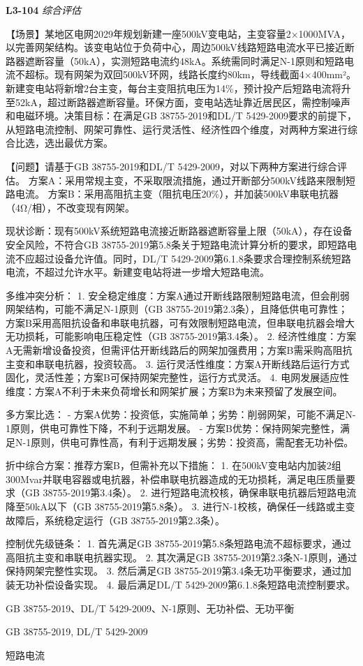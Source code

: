\documentclass[12pt,a4paper]{ctexart}
\begin{document}
\noindent\textbf{L3-104} \hfill \textit{综合评估}
\begin{description}[leftmargin=1.5em,style=nextline,font=\normalfont]
  \item[Q:] 【场景】某地区电网2029年规划新建一座500kV变电站，主变容量2×1000MVA，以完善网架结构。该变电站位于负荷中心，周边500kV线路短路电流水平已接近断路器遮断容量（50kA），实测短路电流约48kA。系统需同时满足N-1原则和短路电流不超标。现有网架为双回500kV环网，线路长度约80km，导线截面4×400mm²。新建变电站将新增2台主变，每台主变阻抗电压为14\%，预计投产后短路电流将升至52kA，超过断路器遮断容量。环保方面，变电站选址靠近居民区，需控制噪声和电磁环境。决策目标：在满足GB 38755-2019和DL/T 5429-2009要求的前提下，从短路电流控制、网架可靠性、运行灵活性、经济性四个维度，对两种方案进行综合比选，选出最优方案。

【问题】请基于GB 38755-2019和DL/T 5429-2009，对以下两种方案进行综合评估。
方案A：采用常规主变，不采取限流措施，通过开断部分500kV线路来限制短路电流。
方案B：采用高阻抗主变（阻抗电压20\%），并加装500kV串联电抗器（4Ω/相），不改变现有网架。
  \item[A:] 现状诊断：现有500kV系统短路电流接近断路器遮断容量上限（50kA），存在设备安全风险，不符合GB 38755-2019第5.8条关于短路电流计算分析的要求，即短路电流不应超过设备允许值。同时，DL/T 5429-2009第6.1.8条要求合理控制系统短路电流，不超过允许水平。新建变电站将进一步增大短路电流。

多维冲突分析：
1. 安全稳定维度：方案A通过开断线路限制短路电流，但会削弱网架结构，可能不满足N-1原则（GB 38755-2019第2.3条），且降低供电可靠性；方案B采用高阻抗设备和串联电抗器，可有效限制短路电流，但串联电抗器会增大无功损耗，可能影响电压稳定性（GB 38755-2019第3.4条）。
2. 经济性维度：方案A无需新增设备投资，但需评估开断线路后的网架加强费用；方案B需采购高阻抗主变和串联电抗器，投资较高。
3. 运行灵活性维度：方案A开断线路后运行方式固化，灵活性差；方案B可保持网架完整性，运行方式灵活。
4. 电网发展适应性维度：方案A不利于未来负荷增长和网架扩展；方案B为未来预留了发展空间。

多方案比选：
- 方案A优势：投资低，实施简单；劣势：削弱网架，可能不满足N-1原则，供电可靠性下降，不利于远期发展。
- 方案B优势：保持网架完整性，满足N-1原则，供电可靠性高，有利于远期发展；劣势：投资高，需配套无功补偿。

折中综合方案：推荐方案B，但需补充以下措施：
1. 在500kV变电站内加装2组300Mvar并联电容器或电抗器，补偿串联电抗器造成的无功损耗，满足电压质量要求（GB 38755-2019第3.4条）。
2. 进行短路电流校核，确保串联电抗器后短路电流降至50kA以下（GB 38755-2019第5.8条）。
3. 进行N-1校核，确保任一线路或主变故障后，系统稳定运行（GB 38755-2019第2.3条）。

控制优先级链条：
1. 首先满足GB 38755-2019第5.8条短路电流不超标要求，通过高阻抗主变和串联电抗器实现。
2. 其次满足GB 38755-2019第2.3条N-1原则，通过保持网架完整性实现。
3. 然后满足GB 38755-2019第3.4条无功平衡要求，通过加装无功补偿设备实现。
4. 最后满足DL/T 5429-2009第6.1.8条短路电流控制要求。
  \item[KW:] GB 38755-2019、DL/T 5429-2009、N-1原则、无功补偿、无功平衡
  \item[Std:] GB 38755-2019, DL/T 5429-2009
  \item[Topic:] 短路电流
\end{description}
\end{document}
